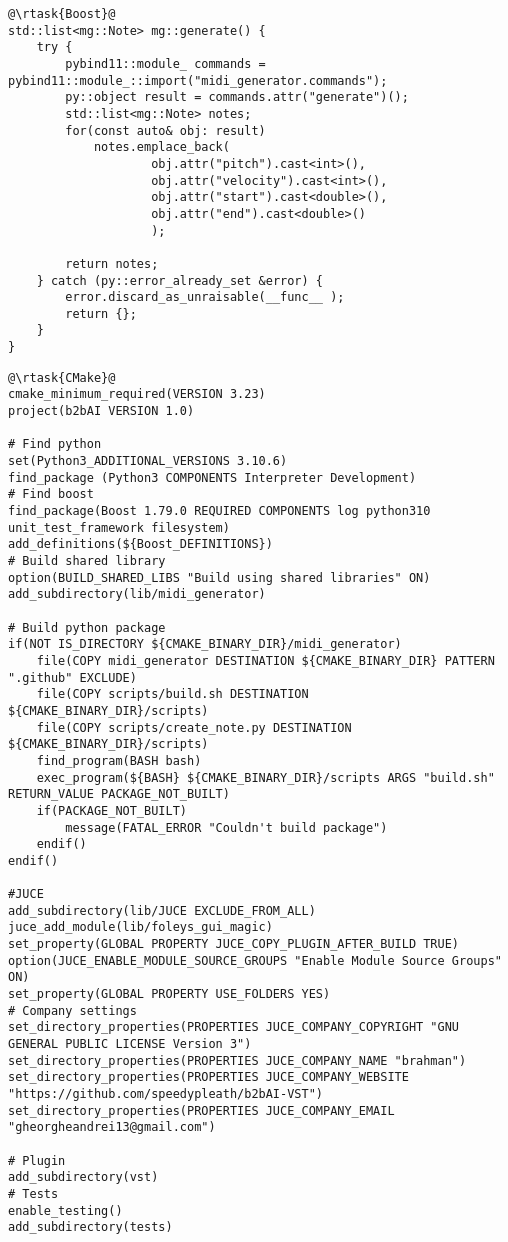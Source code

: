 \begin{verbatim}
@\rtask{Boost}@
std::list<mg::Note> mg::generate() {
    try {
        pybind11::module_ commands = pybind11::module_::import("midi_generator.commands");
        py::object result = commands.attr("generate")();
        std::list<mg::Note> notes;
        for(const auto& obj: result)
            notes.emplace_back(
                    obj.attr("pitch").cast<int>(),
                    obj.attr("velocity").cast<int>(),
                    obj.attr("start").cast<double>(),
                    obj.attr("end").cast<double>()
                    );

        return notes;
    } catch (py::error_already_set &error) {
        error.discard_as_unraisable(__func__ );
        return {};
    }
}
\end{verbatim}

\begin{verbatim}
@\rtask{CMake}@
cmake_minimum_required(VERSION 3.23)
project(b2bAI VERSION 1.0)

# Find python
set(Python3_ADDITIONAL_VERSIONS 3.10.6)
find_package (Python3 COMPONENTS Interpreter Development)
# Find boost
find_package(Boost 1.79.0 REQUIRED COMPONENTS log python310 unit_test_framework filesystem)
add_definitions(${Boost_DEFINITIONS})
# Build shared library
option(BUILD_SHARED_LIBS "Build using shared libraries" ON)
add_subdirectory(lib/midi_generator)

# Build python package
if(NOT IS_DIRECTORY ${CMAKE_BINARY_DIR}/midi_generator)
    file(COPY midi_generator DESTINATION ${CMAKE_BINARY_DIR} PATTERN ".github" EXCLUDE)
    file(COPY scripts/build.sh DESTINATION ${CMAKE_BINARY_DIR}/scripts)
    file(COPY scripts/create_note.py DESTINATION ${CMAKE_BINARY_DIR}/scripts)
    find_program(BASH bash)
    exec_program(${BASH} ${CMAKE_BINARY_DIR}/scripts ARGS "build.sh" RETURN_VALUE PACKAGE_NOT_BUILT)
    if(PACKAGE_NOT_BUILT)
        message(FATAL_ERROR "Couldn't build package")
    endif()
endif()

#JUCE
add_subdirectory(lib/JUCE EXCLUDE_FROM_ALL)
juce_add_module(lib/foleys_gui_magic)
set_property(GLOBAL PROPERTY JUCE_COPY_PLUGIN_AFTER_BUILD TRUE)
option(JUCE_ENABLE_MODULE_SOURCE_GROUPS "Enable Module Source Groups" ON)
set_property(GLOBAL PROPERTY USE_FOLDERS YES)
# Company settings
set_directory_properties(PROPERTIES JUCE_COMPANY_COPYRIGHT "GNU GENERAL PUBLIC LICENSE Version 3")
set_directory_properties(PROPERTIES JUCE_COMPANY_NAME "brahman")
set_directory_properties(PROPERTIES JUCE_COMPANY_WEBSITE "https://github.com/speedypleath/b2bAI-VST")
set_directory_properties(PROPERTIES JUCE_COMPANY_EMAIL "gheorgheandrei13@gmail.com")

# Plugin
add_subdirectory(vst)
# Tests
enable_testing()
add_subdirectory(tests)
\end{verbatim}

